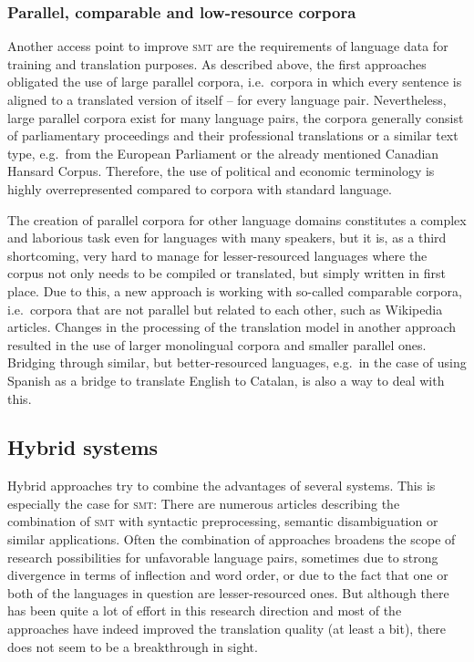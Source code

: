 \documentclass[output=paper]{LSP/langsci}
\begin{document}
\subsubsection{Parallel, comparable and low-resource corpora}\label{sec:stein:3.3.4}

Another access point to improve \textsc{smt} are the requirements of language data for training and translation purposes. As described above, the first approaches obligated the use of large parallel corpora, i.e.\ corpora in which every sentence is aligned to a translated version of itself -- for every language pair. Nevertheless, large parallel corpora exist for many language pairs, the corpora generally consist of parliamentary proceedings and their professional translations or a similar text type, 
e.g.\ from the European Parliament or the already mentioned Canadian Hansard Corpus. Therefore, the use of political and economic terminology is highly overrepresented compared to corpora with standard language. 

The creation of parallel corpora for other language domains constitutes a complex and laborious task even for languages with many speakers, but it is, as a third shortcoming, very hard to manage for lesser-resourced languages where the corpus not only needs to be compiled or translated, but simply written in first place. Due to this, a new approach is working with so-called comparable corpora, i.e.\ corpora that are not parallel but related to each other, such as Wikipedia articles. Changes in the processing of the translation model in another approach resulted in the use of larger monolingual corpora and smaller parallel ones. Bridging through similar, but better-resourced languages, e.g.\ in the case of using Spanish as a bridge to translate English to Catalan, is also a way to deal with this.

\subsection{Hybrid systems}\label{sec:stein:3.4}

Hybrid approaches try to combine the advantages of several systems. This is especially the case for \textsc{smt}: There are numerous articles describing the combination of \textsc{smt} with syntactic preprocessing, semantic disambiguation or similar applications. Often the combination of approaches broadens the scope of research possibilities for unfavorable language pairs, sometimes due to strong divergence in terms of inflection and word order, or due to the fact that one or both of the languages in question are lesser-resourced ones. But although there has been quite a lot of effort in this research direction and most of the approaches have indeed improved the translation quality (at least a bit), there does not seem to be a breakthrough in sight.
\end{document}
